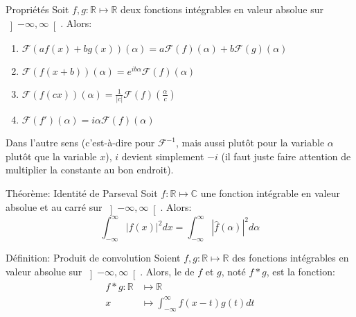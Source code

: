 \documentclass[a4paper]{article}
\begin{document}
\begin{parag}{Propriétés}
    Soit $f, g: \mathbb{R} \mapsto \mathbb{R}$ deux fonctions intégrables en valeur absolue sur $\left]-\infty, \infty\right[ $. Alors:
    \begin{enumerate}
        \item $\mathcal{F}\left(a f\left(x\right) + b g\left(x\right)\right)\left(\alpha\right) = a \mathcal{F}\left(f\right)\left(\alpha\right) + b \mathcal{F}\left(g\right)\left(\alpha\right)$
        \item $\mathcal{F}\left(f\left(x + b\right)\right)\left(\alpha\right) = e^{i b \alpha} \mathcal{F}\left(f\right)\left(\alpha\right)$
        \item $\mathcal{F}\left(f\left(cx\right)\right)\left(\alpha\right) = \frac{1}{\left|c\right|} \mathcal{F}\left(f\right)\left(\frac{\alpha}{c}\right)$
        \item $\mathcal{F}\left(f'\right)\left(\alpha\right) = i\alpha \mathcal{F}\left(f\right)\left(\alpha\right)$
    \end{enumerate}

    Dans l'autre sens (c'est-à-dire pour $\mathcal{F}^{-1}$, mais aussi plutôt pour la variable $\alpha$ plutôt que la variable $x$), $i$ devient simplement $-i$ (il faut juste faire attention de multiplier la constante au bon endroit).
\end{parag}


\begin{parag}{Théorème: Identité de Parseval}
    Soit $f: \mathbb{R} \mapsto \mathbb{C}$ une fonction intégrable en valeur absolue et au carré sur $\left]-\infty, \infty\right[ $. Alors: 
    \[\int_{-\infty}^{\infty} \left|f\left(x\right)\right|^2 dx = \int_{-\infty}^{\infty} \left|\hat{f}\left(\alpha\right)\right|^2 d \alpha\]
\end{parag}

\begin{parag}{Définition: Produit de convolution}
    Soient $f, g : \mathbb{R} \mapsto \mathbb{R}$ des fonctions intégrables en valeur absolue sur $\left]-\infty, \infty\right[ $. Alors, le  de $f$ et $g$, noté $f * g$, est la fonction:
    \[\begin{split}
    f * g: \mathbb{R} &\longmapsto \mathbb{R} \\
    x &\longmapsto \int_{-\infty}^{\infty} f\left(x - t\right)g\left(t\right)dt
    \end{split}\]
\end{parag}
\end{document}
